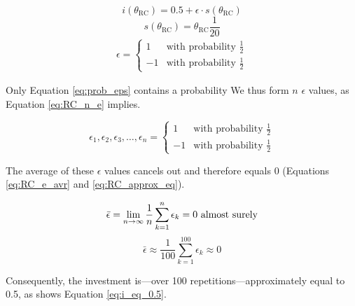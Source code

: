 \documentclass[11pt]{article}
\begin{document}
	\begin{equation}
		i(\theta_{\mathrm{RC}}) = 0.5 + \epsilon \cdot s(\theta_{\mathrm{RC}})
		\label{eq:}
	\end{equation}
	\begin{equation}
		s(\theta_{\mathrm{RC}}) = \theta_{\mathrm{RC}} \frac{1}{20}
		\label{eq:}
	\end{equation}
	\begin{equation}
		\begin{split}
		\epsilon = 
		\begin{cases}
		  1 & \text{with probability } \frac{1}{2}\\
		 -1 & \text{with probability } \frac{1}{2} 
		\end{cases}
		\label{eq:prob_eps}
		\end{split}
	\end{equation}

	\noindent
	Only Equation \ref{eq:prob_eps} contains a probability
	We thus form $n$ $\epsilon$ values, as Equation \ref{eq:RC_n_e} implies.

	\begin{equation}
		\epsilon_1, \epsilon_2, \epsilon_3, \dots, \epsilon_n = 
		\begin{cases}
		  1 & \text{with probability } \frac{1}{2}\\
		 -1 & \text{with probability } \frac{1}{2} 
		\end{cases}
		\label{eq:RC_n_e}
	\end{equation}

	\noindent	
	The average of these $\epsilon$ values cancels out and therefore equals 0 (Equations \ref{eq:RC_e_avr} and \ref{eq:RC_approx_eq}).

	\begin{equation}
		\bar \epsilon = \lim_{n\to\infty} \frac{1}{n} \sum_{k=1}^{n} \epsilon_k = 0 \text{ almost surely}\\
		\label{eq:RC_e_avr}
	\end{equation}
	\begin{equation}
		\bar \epsilon \approx \frac{1}{100} \sum_{k=1}^{100} \epsilon_k \approx 0
		\label{eq:RC_approx_eq}
	\end{equation}

	\noindent
	Consequently, the investment is---over 100 repetitions---approximately equal to 0.5, as shows Equation \ref{eq:i_eq_0.5}.
\end{document}
